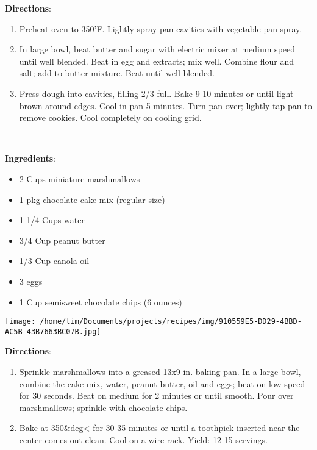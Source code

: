 \documentclass[11pt, twoside, openany]{book}
\begin{document}
\textbf{Directions}:
\vspace{-3mm}\begin{enumerate}\setlength\itemsep{-1mm}
\item Preheat oven to 350'F. Lightly spray pan cavities with vegetable pan spray. 
\item In large bowl, beat butter and sugar with electric mixer at medium speed until well blended. Beat in egg and extracts; mix well. Combine flour and salt; add to butter mixture. Beat until well blended.
\item Press dough into cavities, filling 2/3 full. Bake 9-10 minutes or until light brown around edges. Cool in pan 5 minutes. Turn pan over; lightly tap pan to remove cookies. Cool completely on cooling grid.
\end{enumerate}
 \label{chocolate-peanut-butter-cake-recipe}\hfill\textit{}\\
\begin{minipage}[t]{0.8\linewidth}
\textbf{Ingredients}:\vspace{-3mm}
\begin{multicols}{2}
\begin{itemize}\setlength\itemsep{-1mm}
\item 2 Cups miniature marshmallows
\item 1 pkg chocolate cake mix (regular size)
\item 1 1/4 Cups water
\item 3/4 Cup peanut butter
\item 1/3 Cup canola oil
\item 3 eggs
\item 1 Cup semisweet chocolate chips (6 ounces)
\end{itemize}
\end{multicols}
\end{minipage}
\begin{minipage}[t]{0.2\linewidth}
\centering \strut\vspace*{-\baselineskip}\newline
\texttt{[image: /home/tim/Documents/projects/recipes/img/910559E5-DD29-4BBD-AC5B-43B7663BC07B.jpg]}\\
\end{minipage}\vspace{3mm}
\textbf{Directions}:
\vspace{-3mm}\begin{enumerate}\setlength\itemsep{-1mm}
\item Sprinkle marshmallows into a greased 13x9-in. baking pan. In a large bowl, combine the cake mix, water, peanut butter, oil and eggs; beat on low speed for 30 seconds. Beat on medium for 2 minutes or until smooth. Pour over marshmallows; sprinkle with chocolate chips. 
\item  Bake at 350&deg< for 30-35 minutes or until a toothpick inserted near the center comes out clean. Cool on a wire rack. Yield: 12-15 servings.
\end{enumerate}
\end{document}
